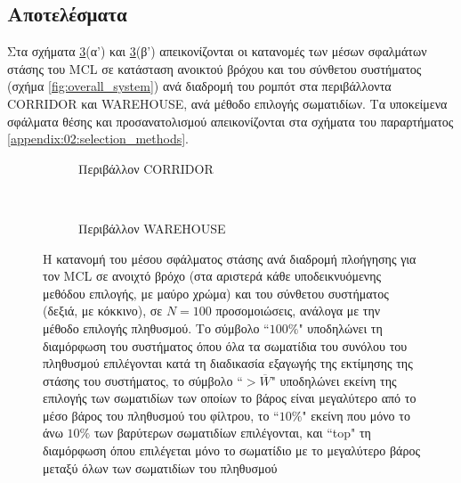 \subsection{Αποτελέσματα}

Στα σχήματα \ref{fig:02_02_04:selections}(α') και
\ref{fig:02_02_04:selections}(β') απεικονίζονται οι κατανομές των μέσων
σφαλμάτων στάσης του MCL σε κατάσταση ανοικτού βρόχου και του σύνθετου
συστήματος (σχήμα \ref{fig:overall_system}) ανά διαδρομή του ρομπότ στα
περιβάλλοντα CORRIDOR και WAREHOUSE, ανά μέθοδο επιλογής σωματιδίων. Τα
υποκείμενα σφάλματα θέσης και προσανατολισμού απεικονίζονται στα σχήματα του
παραρτήματος \ref{appendix:02:selection_methods}.


\begin{figure}
  \vspace{2cm}
  \begin{subfigure}{\linewidth}
  \hspace{-1.25cm}
    
    \vspace{0.3cm}
    \caption{Περιβάλλον CORRIDOR}
    \label{fig:02_02_04:corridor_selections}
  \end{subfigure}\\
  \begin{subfigure}{\linewidth}\vspace{0.5cm}
    \hspace{-1.25cm}
    
    \vspace{0.3cm}
    \caption{Περιβάλλον WAREHOUSE}
    \label{fig:02_02_04:warehouse_selections}
  \end{subfigure}
\caption{\small Η κατανομή του μέσου σφάλματος στάσης ανά διαδρομή πλοήγησης
         για τον MCL σε ανοιχτό βρόχο (στα αριστερά κάθε υποδεικνυόμενης
         μεθόδου επιλογής, με μαύρο χρώμα) και του σύνθετου συστήματος (δεξιά,
         με κόκκινο), σε $N=100$ προσομοιώσεις, ανάλογα με την μέθοδο επιλογής
         πληθυσμού. Το σύμβολο ``$100\%$" υποδηλώνει τη διαμόρφωση του
         συστήματος όπου όλα τα σωματίδια του συνόλου του πληθυσμού επιλέγονται
         κατά τη διαδικασία εξαγωγής της εκτίμησης της στάσης του συστήματος,
         το σύμβολο ``$>\overline{W}$" υποδηλώνει εκείνη της επιλογής των
         σωματιδίων των οποίων το βάρος είναι μεγαλύτερο από το μέσο βάρος του
         πληθυσμού του φίλτρου, το ``$10\%$" εκείνη που μόνο το άνω $10\%$ των
         βαρύτερων σωματιδίων επιλέγονται, και ``top" τη διαμόρφωση όπου
         επιλέγεται μόνο το σωματίδιο με το μεγαλύτερο βάρος μεταξύ όλων των
         σωματιδίων του πληθυσμού}
\label{fig:02_02_04:selections}
\end{figure}

